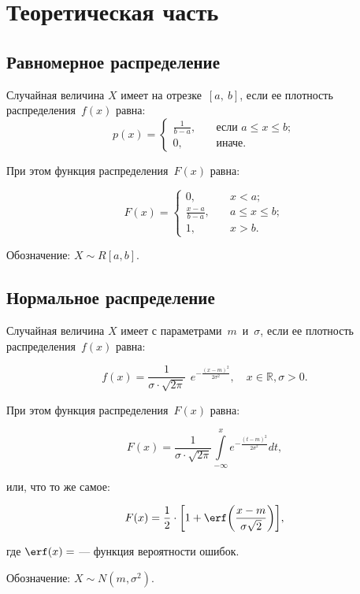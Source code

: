 \chapter{Теоретическая часть}

\section{Равномерное распределение}

Случайная величина $X$ имеет  на
отрезке~$[a,~b]$, если ее плотность распределения~$f(x)$ равна:
\begin{equation}
    p(x) =
    \begin{cases}
        \displaystyle\frac{1}{b - a}, & \quad \text{если } a \leq x \leq b;\\
        0,  & \quad \text{иначе}.
    \end{cases}
\end{equation}

При этом функция распределения~$F(x)$ равна:

\begin{equation}
    F(x) =
    \begin{cases}
        0,  & \quad x < a;\\
        \displaystyle\frac{x - a}{b - a}, & \quad a \leq x \leq b;\\
        1,  & \quad x > b.
    \end{cases}
\end{equation}

Обозначение: $X \sim R[a, b]$.

\section{Нормальное распределение}

Случайная величина $X$ имеет  с
параметрами~$m$~и~$\sigma$, если ее плотность распределения~$f(x)$ равна:

\begin{equation}
    f(x) = \frac{1}{\sigma \cdot \sqrt{2\pi}}~~e^{\displaystyle-\frac{(x -
    m)^2}{2\sigma^2}}, \quad x \in \mathbb{R}, \sigma > 0.
\end{equation}

При этом функция распределения~$F(x)$ равна:

\begin{equation}
    F(x) = \frac{1}{\sigma \cdot \sqrt{2\pi}} \int\limits_{-\infty}^{x}
    e^{\displaystyle-\frac{(t - m)^2}{2\sigma^2}} dt,
\end{equation}

или, что то же самое:

\begin{equation}
    F(x) = \frac{1}{2} \cdot \bigg[1 + \erf\bigg(\frac{x - m}{\sigma
    \sqrt{2}}\bigg)\bigg],
\end{equation}

где $\erf(x) = $ 
 --- функция вероятности
ошибок.

Обозначение: $X \sim N(m, \sigma^2)$.
